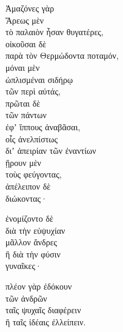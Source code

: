 {\large
\begin{greek}
\noindent Ἀμαζόνες γὰρ \\
\tabto{2em} Ἄρεως μὲν \\
\tabto{4em} τὸ παλαιὸν ἦσαν θυγατέρες, \\
\tabto{2em} οἰκοῦσαι δὲ \\
\tabto{4em} παρὰ τὸν Θερμώδοντα ποταμόν, \\
\tabto{2em} μόναι μὲν \\
\tabto{4em} ὡπλισμέναι σιδήρῳ \\
\tabto{6em} τῶν περὶ αὐτάς, \\
\tabto{2em} πρῶται δὲ \\
\tabto{4em} τῶν πάντων \\
\tabto{6em} ἐφʼ ἵππους ἀναβᾶσαι, \\
\tabto{8em} οἷς ἀνελπίστως \\
\tabto{8em} διʼ ἀπειρίαν τῶν ἐναντίων \\
\tabto{8em} ᾕρουν μὲν \\
\tabto{10em} τοὺς φεύγοντας, \\
\tabto{8em} ἀπέλειπον δὲ \\
\tabto{10em} διώκοντας·

ἐνομίζοντο δὲ \\
\tabto{2em} διὰ τὴν εὐψυχίαν \\
\tabto{4em} μᾶλλον ἄνδρες \\
\tabto{2em} ἢ διὰ τὴν φύσιν \\
\tabto{4em} γυναῖκες·

\tabto{2em} πλέον γὰρ ἐδόκουν \\
\tabto{4em} τῶν ἀνδρῶν \\
\tabto{6em} ταῖς ψυχαῖς διαφέρειν \\
\tabto{6em} ἢ ταῖς ἰδέαις ἐλλείπειν.\\

\end{greek}
}

